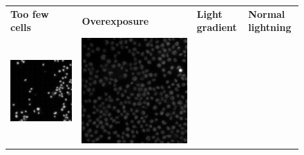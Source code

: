 \begin{figure}
    \centering
    \centering
        \begin{tabularx}{\textwidth}{YYYY}
            \textbf{Too few cells} &
            \textbf{Overexposure} &
            \textbf{Light gradient} &
            \textbf{Normal lightning} \\
            \includegraphics{bilder/lightning-conditions/lightning-1.png} & \includegraphics{bilder/lightning-conditions/lightning-2.png} &

\end{tabularx}
\end{figure}
